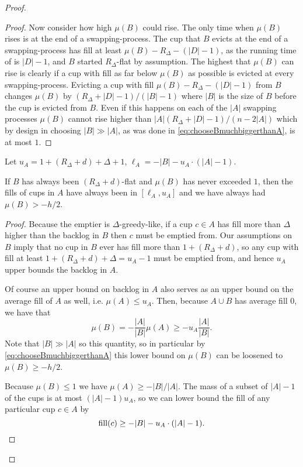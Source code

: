 \begin{proof}
\begin{proof}
  Now consider how high $\mu(B)$ could rise.
  The only time when $\mu(B)$ rises is at the end of a
  swapping-process. The cup that $B$ evicts at the end of a
  swapping-process has fill at least $\mu(B) - R_\Delta - (|D|-1)$,
  as the running time of \randalg is $|D|-1$, and $B$ started
  $R_\Delta$-flat by assumption. The highest that $\mu(B)$ can
  rise is clearly if a cup with fill as far below $\mu(B)$ as possible is
  evicted at every swapping-process. Evicting a cup with fill
  $\mu(B) - R_\Delta - (|D| -1)$ from $B$ changes $\mu(B)$ by 
  $(R_\Delta + |D| - 1) / (|B|-1)$ where $|B|$
  is the size of $B$ before the cup is evicted from $B$. 
  Even if this happens on each of the $|A|$ swapping processes
  $\mu(B)$ cannot rise higher than $|A| (R_\Delta + |D|-1) /
  (n-2|A|)$ which by design in choosing $|B| \gg |A|$,
  as was done in \eqref{eq:chooseBmuchbiggerthanA}, is
  at most $1$.

\end{proof}

Let $u_A = 1 + (R_\Delta + d) + \Delta + 1$, $\ell_A = -|B|
-u_A \cdot (|A| -1)$.
\begin{clm}
  \label{clm:oblivBaseIntenseInduction2}
  If $B$ has always been $(R_\Delta + d)$-flat and $\mu(B)$ has
  never exceeded $1$, then the fills of cups in $A$ have always
  been in $[\ell_A, u_A]$ and we have always had $\mu(B) > -h/2$.
\end{clm}
\begin{proof}
  Because the emptier is $\Delta$-greedy-like, if a cup $c\in A$
  has fill more than $\Delta$ higher than the backlog in $B$ then
  $c$ must be emptied from. Our assumptions on $B$ imply that no
  cup in $B$ ever has fill more than $1 + (R_\Delta + d)$, so any
  cup with fill at least $1 + (R_\Delta + d) + \Delta = u_A - 1$ must
  be emptied from, and hence $u_A$ upper bounds the backlog in
  $A$. 

  Of course an upper bound on backlog in $A$ also serves as
  an upper bound on the average fill of $A$ as well, i.e. $\mu(A)
  \le u_A$. Then, because $A\cup B$ has average fill $0$, we have that 
  $$\mu(B) = -\frac{|A|}{|B|} \mu(A) \ge -u_A \frac{|A|}{|B|}.$$
  Note that $|B| \gg |A|$ so this quantity, so in particular by
  \eqref{eq:chooseBmuchbiggerthanA} this lower bound on $\mu(B)$
  can be loosened to $\mu(B) \ge -h/2$.

  Because $\mu(B) \le 1$ we have $\mu(A) \ge -|B|/|A|$. The mass
  of a subset of $|A|-1$ of the cups is at most $(|A|-1)u_A$, so
  we can lower bound the fill of any particular cup $c \in A$ by 
  $$\operatorname{\textnormal{fill}}(c) \ge -|B| -u_A \cdot (|A| -1).$$
\end{proof}


\end{proof}
